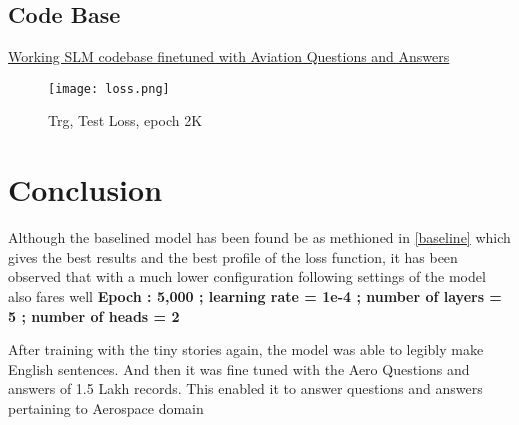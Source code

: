 \documentclass[conference]{IEEEtran}
\begin{document}
\subsection{Code Base}
\href{https://colab.research.google.com/github/samratkar/samratkar.github.io/blob/main/_posts/concepts/genai/notes-codes/aeroslm/aeroslm_finetune.ipynb}{Working SLM codebase finetuned with Aviation Questions and Answers}

\begin{figure}[H]
    \centering
    \texttt{[image: loss.png]}
    \caption{Trg, Test Loss, epoch 2K}
    \label{fig:epoch}
\end{figure}

\section{Conclusion}
Although the baselined model has been found be as methioned in \ref{baseline} which gives the best results and the best profile of the loss function, it has been observed that with a much lower configuration following settings of the model also fares well 
\textbf{Epoch : 5,000 ; learning rate = 1e-4 ; number of layers = 5 ; number of heads = 2}

After training with the tiny stories again, the model was able to legibly make English sentences. And then it was fine tuned with the Aero Questions and answers of 1.5 Lakh records. This enabled it to answer questions and answers pertaining to Aerospace domain
\end{document}
